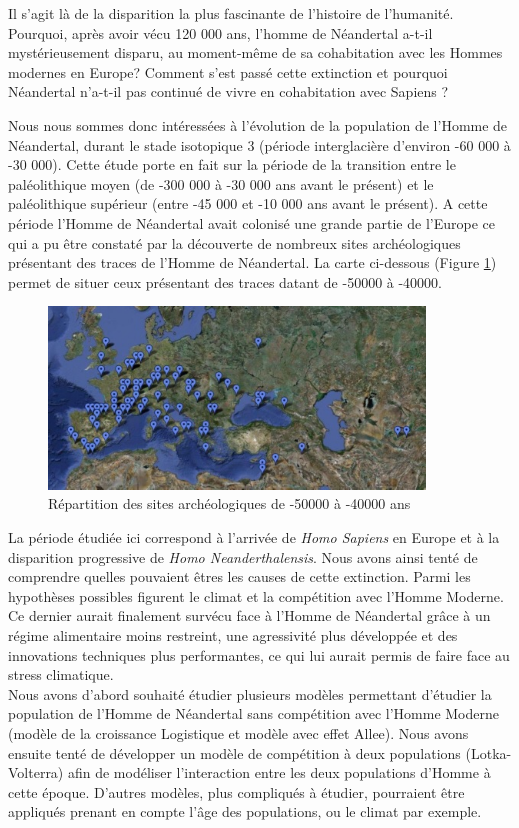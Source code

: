 \documentclass[a4paper,11pt]{article}
\begin{document}
Il s'agit là de la disparition la plus fascinante de l’histoire de l’humanité. Pourquoi, après avoir vécu 120 000 ans, l'homme de Néandertal a-t-il mystérieusement disparu, au moment-même de sa cohabitation avec les Hommes modernes en Europe?  Comment s'est passé cette extinction et pourquoi Néandertal n'a-t-il pas continué de vivre en cohabitation avec Sapiens ? 
	 
Nous nous sommes donc intéressées à l'évolution de la population de l'Homme de Néandertal, durant le stade isotopique 3 (période interglacière d'environ -60 000 à -30 000). Cette étude porte en fait sur la période de la transition entre le paléolithique moyen (de -300 000 à -30 000 ans avant le présent) et  le paléolithique supérieur (entre -45 000 et -10 000 ans avant le présent). A cette période l'Homme de Néandertal avait colonisé une grande partie de l'Europe ce qui a pu être constaté par la découverte de nombreux sites archéologiques présentant des traces de l'Homme de Néandertal. La carte ci-dessous (Figure \ref{C1}) permet de situer ceux présentant des traces datant de -50000 à -40000. \\
 
\begin{figure}[H]
	\centering
    \includegraphics[width=10cm]{SiteArche.jpg}
    \caption{Répartition des sites archéologiques de -50000 à -40000 ans}
    \label{C1}
\end{figure}
La période étudiée ici correspond à l'arrivée de \textit{Homo Sapiens} en Europe et à la disparition progressive de \textit{Homo Neanderthalensis}. Nous avons ainsi tenté de comprendre quelles pouvaient êtres les causes de cette extinction. Parmi les hypothèses possibles figurent le climat et la compétition avec l'Homme Moderne. Ce dernier aurait finalement survécu face à l'Homme de Néandertal grâce à un régime alimentaire moins restreint, une agressivité plus développée et des innovations techniques plus performantes, ce qui lui aurait permis de faire face au stress climatique.\\
Nous avons d'abord souhaité étudier plusieurs modèles permettant d'étudier la population de  l'Homme de Néandertal sans compétition avec l'Homme Moderne (modèle de la croissance Logistique et modèle avec effet Allee). Nous avons ensuite tenté de développer un modèle de compétition à deux populations (Lotka-Volterra) afin de modéliser l'interaction entre les deux populations d'Homme à cette époque. D'autres modèles, plus compliqués à étudier, pourraient être appliqués prenant en compte l'âge des populations, ou le climat par exemple.
\end{document}
